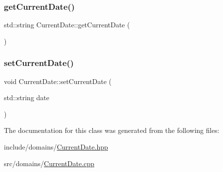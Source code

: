 \subsubsection{\texorpdfstring{getCurrentDate()}{getCurrentDate()}}
{\footnotesize\ttfamily std\+::string Current\+Date\+::get\+Current\+Date (\begin{DoxyParamCaption}{ }\end{DoxyParamCaption})}

\mbox{\label{class_current_date_a01fbf35d387f69df1a16eb9899b5c9ab}} 
\subsubsection{\texorpdfstring{setCurrentDate()}{setCurrentDate()}}
{\footnotesize\ttfamily void Current\+Date\+::set\+Current\+Date (\begin{DoxyParamCaption}\item[{std\+::string}]{date }\end{DoxyParamCaption})}



The documentation for this class was generated from the following files\+:\begin{DoxyCompactItemize}
\item 
include/domains/\mbox{\hyperlink{_current_date_8hpp}{Current\+Date.\+hpp}}\item 
src/domains/\mbox{\hyperlink{_current_date_8cpp}{Current\+Date.\+cpp}}\end{DoxyCompactItemize}
